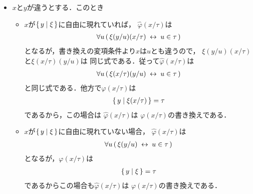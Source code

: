 \begin{metaprf}[第一]
\begin{description}
\begin{description}
\begin{itemize}
							\item $x$と$y$が違うとする．このとき
								\begin{itemize}
									\item $x$が$\{\, y \mid \xi\, \}$に自由に現れていれば，
										$\widehat{\varphi}(x/\tau)$は
										\begin{align}
											\forall u\, (\, \xi(y/u)(x/\tau) \hspace{0.25em}\leftrightarrow\hspace{0.25em} u \in \tau\, )
										\end{align}
										となるが，書き換えの変項条件より$x$は$u$とも違うので，
										$\xi(y/u)(x/\tau)$と$\xi(x/\tau)(y/u)$は
										同じ式である．従って$\widehat{\varphi}(x/\tau)$は
										\begin{align}
											\forall u\, (\, \xi(x/\tau)(y/u) \hspace{0.25em}\leftrightarrow\hspace{0.25em} u \in \tau\, )
										\end{align}
										と同じ式である．他方で$\varphi(x/\tau)$は
										\begin{align}
											\{\, y \mid \xi(x/\tau)\, \} = \tau
										\end{align}
										であるから，この場合は
										$\widehat{\varphi}(x/\tau)$は
										$\varphi(x/\tau)$の書き換えである．
								
									\item $x$が$\{\, y \mid \xi\, \}$に自由に現れていない場合，
										$\widehat{\varphi}(x/\tau)$は
										\begin{align}
											\forall u\, (\, \xi(y/u) \hspace{0.25em}\leftrightarrow\hspace{0.25em} u \in \tau\, )
										\end{align}
										となるが，$\varphi(x/\tau)$は
										\begin{align}
											\{\, y \mid \xi\, \} = \tau
										\end{align}
										であるからこの場合も$\widehat{\varphi}(x/\tau)$は
										$\varphi(x/\tau)$の書き換えである．
								\end{itemize}
						\end{itemize}
						

\end{description}
\end{description}
\end{metaprf}
